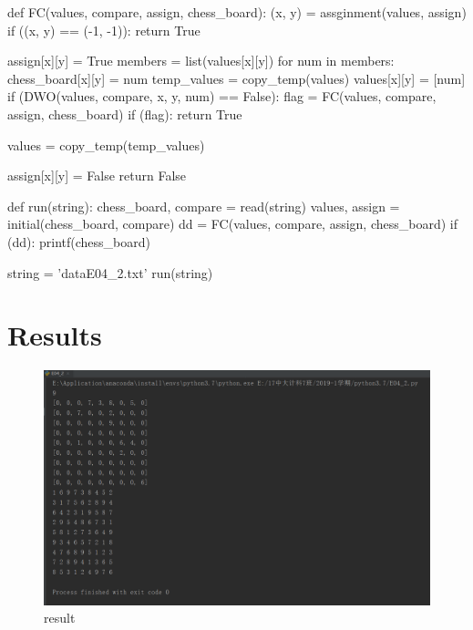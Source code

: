 ﻿\documentclass[a4paper, 11pt]{article}
\begin{document}
\begin{python}
def FC(values, compare, assign, chess_board):
    (x, y) = assginment(values, assign)
    if ((x, y) == (-1, -1)):
        return True

    assign[x][y] = True
    members = list(values[x][y])
    for num in members:
        chess_board[x][y] = num
        temp_values = copy_temp(values)
        values[x][y] = [num]
        if (DWO(values, compare, x, y, num) == False):
            flag = FC(values, compare, assign, chess_board)
            if (flag):
                return True

        values = copy_temp(temp_values)

    assign[x][y] = False
    return False


def run(string):
    chess_board, compare = read(string)
    values, assign = initial(chess_board, compare)
    dd = FC(values, compare, assign, chess_board)
    if (dd):
        printf(chess_board)



string = 'dataE04_2.txt'
run(string)


\end{python}


\section{Results}
\begin{figure}[h]
  \centering
  \includegraphics{Pic/result.png}
  
  \caption{result}
\end{figure}

%
%
\end{document}

